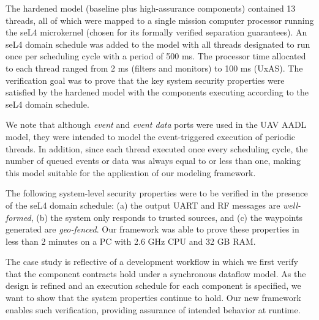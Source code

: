 The hardened model (baseline plus high-assurance components) contained 13 threads,
all of which were mapped to a single mission computer processor running the seL4 microkernel (chosen for its formally verified separation guarantees).
An seL4 domain schedule was added to the model with all threads designated to run once per scheduling cycle with a period of 500 ms.
The processor time allocated to each thread ranged from 2 ms (filters and monitors) to 100 ms (UxAS).
The verification goal was to prove that the key system security properties were satisfied by the hardened model with the components executing according to the seL4 domain schedule.

We note that although \textit{event} and \textit{event data} ports were used in the UAV AADL model, they were intended to model the event-triggered execution of periodic threads.
In addition, since each thread executed once every scheduling cycle, the number of queued events or data was always equal to or less than one,
making this model suitable for the application of our modeling framework.

The following system-level security properties were to be verified in the presence of the seL4 domain schedule:
(a) the output UART and RF messages are \emph{well-formed},
(b) the system only responds to trusted sources, and
(c) the waypoints generated are \emph{geo-fenced}.
Our framework was able to prove these properties in less than 2 minutes on a PC with 2.6 GHz CPU and 32 GB RAM.

The case study is reflective of a development workflow in which we first verify that the component contracts hold under a synchronous dataflow model.  As the design is refined and an execution schedule for each component is specified, we want to show that the system properties continue to hold.  Our new framework enables such verification, providing assurance of intended behavior at runtime. 